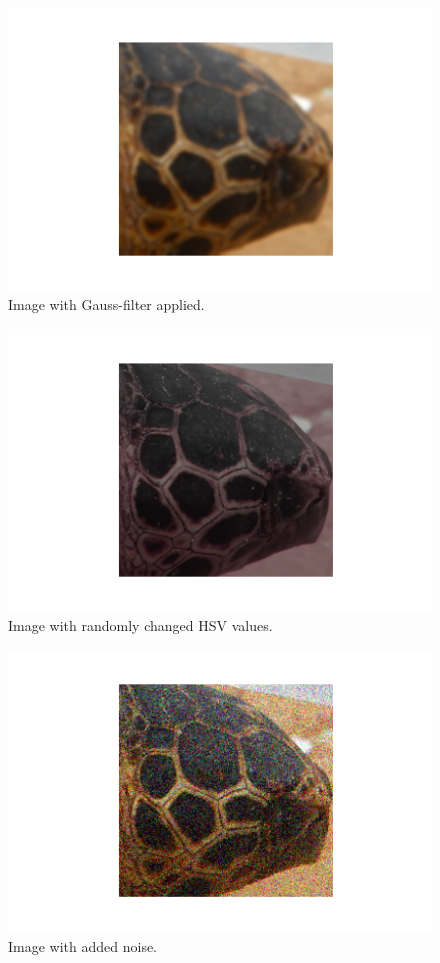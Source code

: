 \begin{figure}[h!]
    \centering
    \includegraphics{images/turtles/augmented/gaussian.png}
    \caption{Image with Gauss-filter applied.}
    \label{fig:turtleGauss}
\end{figure}

\begin{figure}[h]
    \centering
    \includegraphics{images/turtles/augmented/hsv.png}
    \caption{Image with randomly changed HSV values.}
    \label{fig:turtleHSV}
\end{figure}

\begin{figure}[h]
    \centering
    \includegraphics{images/turtles/augmented/noise.png}
    \caption{Image with added noise.}
    \label{fig:turtleNoise}
\end{figure}


